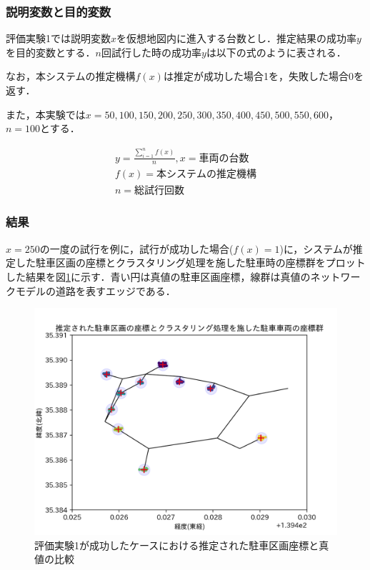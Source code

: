 \subsubsection{説明変数と目的変数}
\label{evaluation-test-1-var}
評価実験1では説明変数$x$を仮想地図内に進入する台数とし．推定結果の成功率$y$を目的変数とする．$n$回試行した時の成功率$y$は以下の式のように表される．

なお，本システムの推定機構$f(x)$は推定が成功した場合1を，失敗した場合0を返す．

また，本実験では$x = 50,100,150,200,250,300,350,400,450,500,550,600$，$n=100$とする．

\begin{align}
	y = \frac{\sum_{i=1}^{n} f(x)}{n},x = 車両の台数 \\
	f(x) = 本システムの推定機構                 \\
	n = 総試行回数                                   
\end{align}



\subsubsection{結果}
$x=250$の一度の試行を例に，試行が成功した場合($f(x) = 1$)に，システムが推定した駐車区画の座標とクラスタリング処理を施した駐車時の座標群をプロットした結果を図\ref{evaluation-test-1-success}に示す．青い円は真値の駐車区画座標，線群は真値のネットワークモデルの道路を表すエッジである．

\begin{figure}
	\centering
	\includegraphics[width=14cm]{fig/eval-test-1-success.png}
	\caption{評価実験1が成功したケースにおける推定された駐車区画座標と真値の比較}
	\label{evaluation-test-1-success}
\end{figure}

